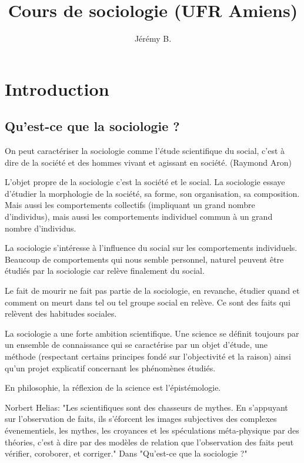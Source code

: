 ﻿\documentclass[12pt, a4paper, openany]{book}
\author{Jérémy B.}
\date{}
\title{Cours de sociologie (UFR Amiens)}
\begin{document}
\maketitle

\chapter{Introduction}

	\section{Qu'est-ce que la sociologie ?}

On peut caractériser la sociologie comme l'étude scientifique du social, c'est à dire de la société et des hommes vivant et agissant en société. (Raymond Aron) %

L'objet propre de la sociologie c'est la société et le social. La sociologie essaye d'étudier la morphologie de la société, sa forme, son organisation, sa composition. Mais aussi les comportements collectifs (impliquant un grand nombre d'individus), mais aussi les comportements individuel commun à un grand nombre d'individus.

La sociologie s'intéresse à l'influence du social sur les comportements individuels. Beaucoup de comportements qui nous semble personnel, naturel peuvent être étudiés par la sociologie car relève finalement du social.

Le fait de mourir ne fait pas partie de la sociologie, en revanche, étudier quand et comment on meurt dans tel ou tel groupe social en relève. Ce sont des faits qui relèvent des habitudes sociales. \newline

La sociologie a une forte ambition scientifique. Une science se définit toujours par un ensemble de connaissance qui se caractérise par un objet d'étude, une méthode (respectant certains principes fondé sur l'objectivité et la raison) ainsi qu'un projet explicatif concernant les phénomènes étudiés.

En philosophie, la réflexion de la science est l'épistémologie.

Norbert Helias: "Les scientifiques sont des chasseurs de mythes. En s'appuyant sur l'observation de faits, ils s'éforcent les images subjectives des complexes évenementiels, les mythes, les croyances et les spéculations méta-physique par des théories, c'est à dire par des modèles de relation que l'observation des faits peut vérifier, coroborer, et corriger." Dans "Qu'est-ce que la sociologie ?"
\end{document}

